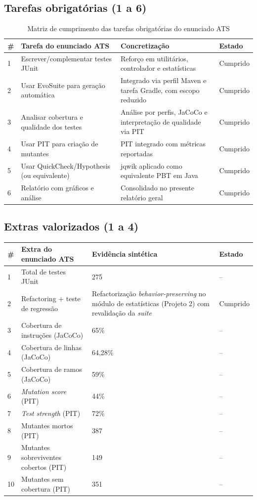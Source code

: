 \documentclass{article}
\begin{document}
\subsection{Tarefas obrigatórias (1 a 6)}
\begin{table}[H]
\centering
\begin{tabular}{p{}p{}p{}p{}}
\toprule
\# & Tarefa do enunciado ATS & Concretização & Estado \\
\midrule
1 & Escrever/complementar testes JUnit & Reforço em utilitários, controlador e estatísticas & Cumprido \\
2 & Usar EvoSuite para geração automática & Integrado via perfil Maven e tarefa Gradle, com escopo reduzido & Cumprido \\
3 & Analisar cobertura e qualidade dos testes & Análise por perfis, JaCoCo e interpretação de qualidade via PIT & Cumprido \\
4 & Usar PIT para criação de mutantes & PIT integrado com métricas reportadas & Cumprido \\
5 & Usar QuickCheck/Hypothesis (ou equivalente) & jqwik aplicado como equivalente PBT em Java & Cumprido \\
6 & Relatório com gráficos e análise & Consolidado no presente relatório geral & Cumprido \\
\bottomrule
\end{tabular}
\caption{Matriz de cumprimento das tarefas obrigatórias do enunciado ATS}
\end{table}

\subsection{Extras valorizados (1 a 4)}

\begin{table}[H]
\centering
\begin{tabular}{p{} p{} p{} p{}}
\toprule
\# & Extra do enunciado ATS & Evidência sintética & Estado \\
\midrule
1 & Total de testes JUnit & 275 & -- \\
2 & Refactoring + teste de regressão & Refactorização \emph{behavior-preserving} no módulo de estatísticas (Projeto 2) com revalidação da \emph{suite} & Cumprido \\
3 & Cobertura de instruções (JaCoCo) & 65\% & -- \\
4 & Cobertura de linhas (JaCoCo) & 64,28\% & -- \\
5 & Cobertura de ramos (JaCoCo) & 59\% & -- \\
6 & \emph{Mutation score} (PIT) & 44\% & -- \\
7 & \emph{Test strength} (PIT) & 72\% & -- \\
8 & Mutantes mortos (PIT) & 387 & -- \\
9 & Mutantes sobreviventes cobertos (PIT) & 149 & -- \\
10 & Mutantes sem cobertura (PIT) & 351 & -- \\
\bottomrule
\end{tabular}
\end{table}
\end{document}
